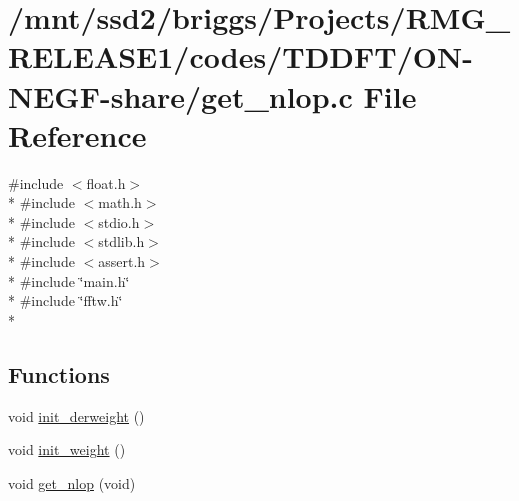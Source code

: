 \hypertarget{_t_d_d_f_t_2_o_n-_n_e_g_f-share_2get__nlop_8c}{\section{/mnt/ssd2/briggs/\-Projects/\-R\-M\-G\-\_\-\-R\-E\-L\-E\-A\-S\-E1/codes/\-T\-D\-D\-F\-T/\-O\-N-\/\-N\-E\-G\-F-\/share/get\-\_\-nlop.c File Reference}
\label{_t_d_d_f_t_2_o_n-_n_e_g_f-share_2get__nlop_8c}
}
{\ttfamily \#include $<$float.\-h$>$}\\*
{\ttfamily \#include $<$math.\-h$>$}\\*
{\ttfamily \#include $<$stdio.\-h$>$}\\*
{\ttfamily \#include $<$stdlib.\-h$>$}\\*
{\ttfamily \#include $<$assert.\-h$>$}\\*
{\ttfamily \#include \char`\"{}main.\-h\char`\"{}}\\*
{\ttfamily \#include \char`\"{}fftw.\-h\char`\"{}}\\*
\subsection*{Functions}
\begin{DoxyCompactItemize}
\item 
void \hyperlink{_t_d_d_f_t_2_o_n-_n_e_g_f-share_2get__nlop_8c_afb0102166824d1ff9c2fd960d46418e2}{init\-\_\-derweight} ()
\item 
void \hyperlink{_t_d_d_f_t_2_o_n-_n_e_g_f-share_2get__nlop_8c_af4412b7ada119a225a77bf89cf7a89cd}{init\-\_\-weight} ()
\item 
void \hyperlink{_t_d_d_f_t_2_o_n-_n_e_g_f-share_2get__nlop_8c_aa95f1182143aec2e4d1ce140520f3fa1}{get\-\_\-nlop} (void)
\end{DoxyCompactItemize}


